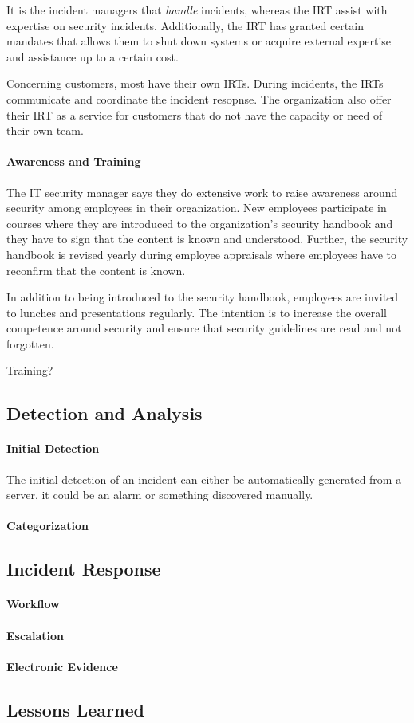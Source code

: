 It is the incident managers that \emph{handle} incidents, whereas the \ac{IRT} assist with expertise on security incidents. Additionally, the \ac{IRT} has granted certain mandates that allows them to shut down systems or acquire external expertise and assistance up to a certain cost.    

Concerning customers, most have their own \acp{IRT}. During incidents, the \acp{IRT} communicate and coordinate the incident resopnse. The organization also offer their \ac{IRT} as a service for customers that do not have the capacity or need of their own team. 

\paragraph{Awareness and Training}
The IT security manager says they do extensive work to raise awareness around security among employees in their organization. New employees participate in courses where they are introduced to the organization's security handbook and they have to sign that the content is known and understood. Further, the security handbook is revised yearly during employee appraisals where employees have to reconfirm that the content is known.  

In addition to being introduced to the security handbook, employees are invited to lunches and presentations regularly. The intention is to increase the overall competence around security and ensure that security guidelines are read and not forgotten. 

Training?


\subsection{Detection and Analysis}
\paragraph{Initial Detection}
The initial detection of an incident can either be automatically generated from a server, it could be an alarm or something discovered manually.

\paragraph{Categorization}


\subsection{Incident Response}
\paragraph{Workflow}
\paragraph{Escalation}
\paragraph{Electronic Evidence}


\subsection{Lessons Learned}